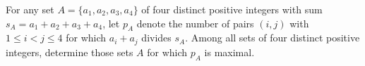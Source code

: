 For any set $A = \{a_1, a_2, a_3, a_4\}$ of four distinct positive integers with sum $s_A = a_1 + a_2 + a_3 + a_4$, let $p_A$ denote the number of pairs $(i, j)$ with $1 \leq i < j \leq 4$ for which $a_i + a_j$ divides $s_A$. Among all sets of four distinct positive integers, determine those sets $A$ for which $p_A$ is maximal.
